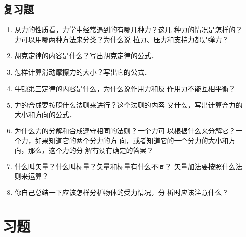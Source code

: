 \subsection*{复习题} 

\begin{enumerate} 
\item 从力的性质看，力学中经常遇到的有哪几种力？这几
种力的情况是怎样的？力可以用哪两种方法来分类？为什么说
拉力、压力和支持力都是弹力？
\item
胡克定律的内容是什么？写出胡克定律的公式．
\item
怎样计算滑动摩擦力的大小？写出它的公式．
\item 牛顿第三定律的内容是什么，为什么说作用力和反
作用力不能互相平衡？
\item
力的合成要按照什么法则来进行？这个法则的内容
又什么，写出计算合力的大小和方向的公式．
\item
为什么力的分解和合成遵守相同的法则？一个力可
以根据什么来分解它？一个力，如果知道它的两个分力的方
向，或者知道它的一个分力的大小和方向，那么，这个力的分
解有没有确定的答案？
\item
什么叫矢量？什么叫标量？矢量和标量有什么不同？
矢量加法要按照什么法则来运算？
\item
你自己总结一下应该怎样分析物体的受力情况，分
析时应该注意什么？
\end{enumerate} 

\section*{习题} 

